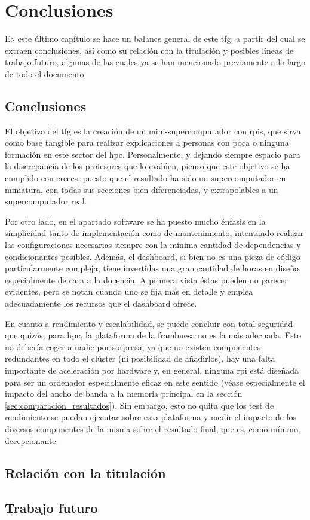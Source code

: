 \chapter{Conclusiones}
\label{chap:conclusiones}

\lettrine{E}{n} este último capítulo se hace un balance general de este \acrlong{tfg}, a partir del cual se extraen conclusiones, así como su relación con la titulación y posibles líneas de trabajo futuro, algunas de las cuales ya se han mencionado previamente a lo largo de todo el documento.

\section{Conclusiones}
El objetivo del \acrshort{tfg} es la creación de un mini-supercomputador con \acrlong{rpi}s, que sirva como base tangible para realizar explicaciones a personas con poca o ninguna formación en este sector del \acrshort{hpc}. Personalmente, y dejando siempre espacio para la discrepancia de los profesores que lo evalúen, pienso que este objetivo se ha cumplido con creces, puesto que el resultado ha sido un supercomputador en miniatura, con todas sus secciones bien diferenciadas, y extrapolables a un supercomputador real. 

Por otro lado, en el apartado software se ha puesto mucho énfasis en la simplicidad tanto de implementación como de mantenimiento, intentando realizar las configuraciones necesarias siempre con la mínima cantidad de dependencias y condicionantes posibles. Además, el dashboard, si bien no es una pieza de código particularmente compleja, tiene invertidas una gran cantidad de horas en diseño, especialmente de cara a la docencia. A primera vista éstas pueden no parecer evidentes, pero se notan cuando uno se fija más en detalle y emplea adecuadamente los recursos que el dashboard ofrece.

En cuanto a rendimiento y escalabilidad, se puede concluir con total seguridad que quizás, para \acrshort{hpc}, la plataforma de la frambuesa no es la más adecuada. Esto no debería coger a nadie por sorpresa, ya que no existen componentes redundantes en todo el clúster (ni posibilidad de añadirlos), hay una falta importante de aceleración por hardware y, en general, ninguna \acrlong{rpi} está diseñada para ser un ordenador especialmente eficaz en este sentido (véase especialmente el impacto del ancho de banda a la memoria principal en la sección \ref{sec:comparacion_resultados}). Sin embargo, esto no quita que los test de rendimiento se puedan ejecutar sobre esta plataforma y medir el impacto de los diversos componentes de la misma sobre el resultado final, que es, como mínimo, decepcionante.

\section{Relación con la titulación}

\section{Trabajo futuro}
